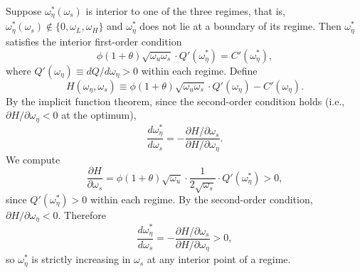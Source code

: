     Suppose $\omega_\eta^*(\omega_s)$ is interior to one of the three regimes, that is, $\omega_\eta^*(\omega_s) \notin \{0, \omega_L, \omega_H\}$ and $\omega_\eta^*$ does not lie at a boundary of its regime. Then $\omega_\eta^*$ satisfies the interior first-order condition
    \[
    \phi(1+\theta)\sqrt{\omega_u \omega_s} \cdot Q'(\omega_\eta^*) = C'(\omega_\eta^*), \tag{FOC}
    \]
    where $Q'(\omega_\eta) \equiv dQ/d\omega_\eta > 0$ within each regime. Define
    \[
    H(\omega_\eta, \omega_s)
    \equiv \phi(1+\theta)\sqrt{\omega_u \omega_s} \cdot Q'(\omega_\eta) - C'(\omega_\eta).
    \]
    By the implicit function theorem, since the second-order condition holds (i.e., $\partial H/\partial \omega_\eta < 0$ at the optimum),
    \[
    \frac{d\omega_\eta^*}{d\omega_s}
    = -\frac{\partial H/\partial \omega_s}{\partial H/\partial \omega_\eta}.
    \]
    We compute
    \[
    \frac{\partial H}{\partial \omega_s}
    = \phi(1+\theta)\sqrt{\omega_u}
    \cdot \frac{1}{2\sqrt{\omega_s}}
    \cdot Q'(\omega_\eta^*) > 0,
    \]
    since $Q'(\omega_\eta^*) > 0$ within each regime. By the second-order condition, $\partial H/\partial \omega_\eta < 0$. Therefore
    \[
    \frac{d\omega_\eta^*}{d\omega_s}
    = -\frac{\partial H/\partial \omega_s}{\partial H/\partial \omega_\eta} > 0,
    \]
    so $\omega_\eta^*$ is strictly increasing in $\omega_s$ at any interior point of a regime.
